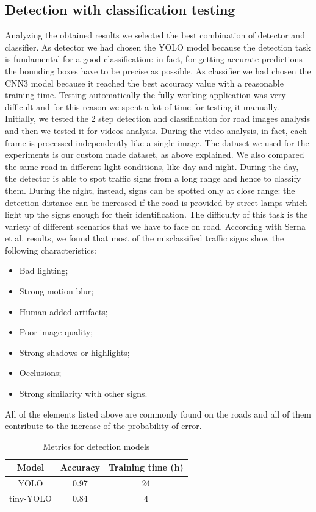 \documentclass[10pt,twocolumn,letterpaper]{article}
\begin{document}
\subsection{Detection with classification testing}
Analyzing the obtained results we selected the best combination of detector and classifier. As detector we had chosen the YOLO model because the detection task is fundamental for a good classification: in fact, for getting accurate predictions the bounding boxes have to be precise as possible. As classifier we had chosen the CNN3 model because it reached the best accuracy value with a reasonable training time. Testing automatically the fully working application was very difficult and for this reason we spent a lot of time for testing it manually. Initially, we tested the 2 step detection and classification for road images analysis and then we tested it for videos analysis. During the video analysis, in fact, each frame is processed independently like a single image. The dataset we used for the experiments is our custom made dataset, as above explained. We also compared the same road in different light conditions, like day and night. During the day, the detector is able to spot traffic signs from a long range and hence to classify them. During the night, instead, signs can be spotted only at close range: the detection distance can be increased if the road is provided by street lamps which light up the signs enough for their identification. 
The difficulty of this task is the variety of different scenarios that we have to face on road. According with Serna et al. \cite{gamezPaper} results, we found that most of the misclassified traffic signs show the following characteristics:
\begin{itemize}[noitemsep,topsep=0pt]
	\item Bad lighting;
	\item Strong motion blur;
	\item Human added artifacts;
	\item Poor image quality;
	\item Strong shadows or highlights;
	\item Occlusions;
	\item Strong similarity with other signs.
\end{itemize} 
All of the elements listed above are commonly found on the roads and all of them contribute to the increase of the probability of error.

\begin{table}[h!]
	\begin{center}
		\begin{tabular}{|c|c|c|}
			\hline
			Model & Accuracy & Training time (h) \\
			\hline\hline
			YOLO & 0.97 & 24 \\
			tiny-YOLO & 0.84 & 4 \\
			\hline
		\end{tabular}
	\end{center}
	\caption{Metrics for detection models}
	\label{yolo-metrics}
\end{table}
\end{document}
